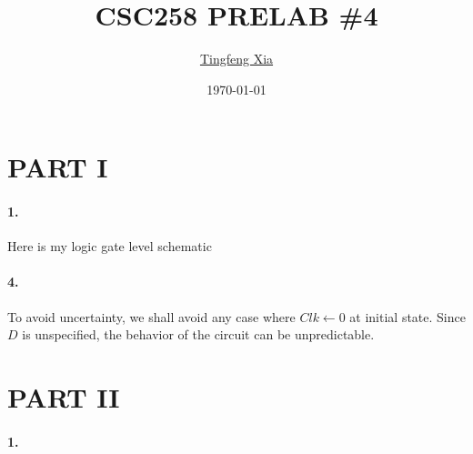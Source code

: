 \documentclass[oneside, 10pt]{article}
\title{\LARGE CSC258 PRELAB \#4}
\author{\href{https://tingfengx.github.io}{Tingfeng Xia}}
\date{\today}
\begin{document}
\maketitle
\section*{PART I}
\paragraph{1.} Here is my logic gate level schematic
\begin{center}

\end{center}
\paragraph{4.} To avoid uncertainty, we shall avoid any case where $Clk\gets 0$ 
at initial state. Since $D$ is unspecified, the behavior of the circuit can be 
unpredictable. 

\section*{PART II}
\paragraph{1.} 
\end{document}
